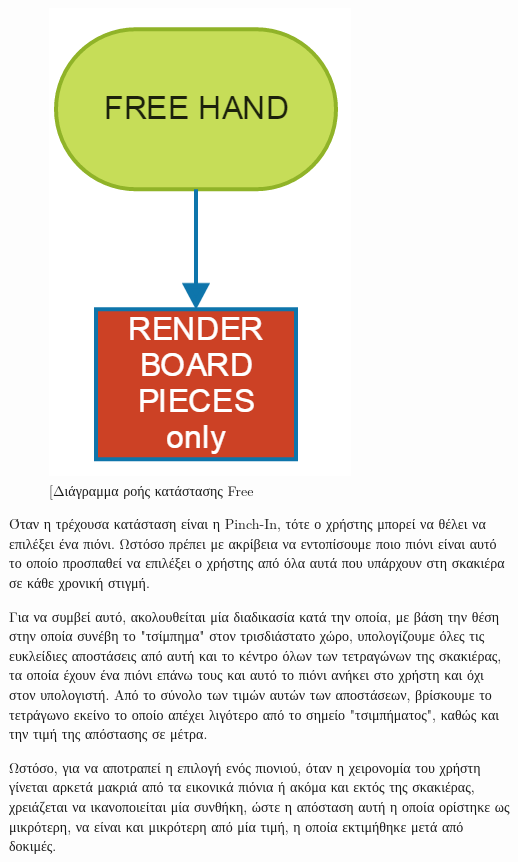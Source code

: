 \begin{figure}[H]
    \centering
    \includegraphics[scale=0.5, angle=0]{Files/Figures/free_hand.png}
    \caption[Διάγραμμα ροής κατάστασης Free]{[Διάγραμμα ροής κατάστασης Free}
    \label{fig:free}
\end{figure}



Όταν η τρέχουσα κατάσταση είναι η Pinch-In, τότε ο χρήστης μπορεί να θέλει να επιλέξει ένα πιόνι. Ωστόσο πρέπει με ακρίβεια να εντοπίσουμε ποιο πιόνι είναι αυτό το οποίο προσπαθεί να επιλέξει ο χρήστης από όλα αυτά που υπάρχουν στη σκακιέρα σε κάθε χρονική στιγμή. 

Για να συμβεί αυτό, ακολουθείται μία διαδικασία κατά την οποία, με βάση την θέση στην οποία συνέβη το "τσίμπημα" στον τρισδιάστατο χώρο, υπολογίζουμε όλες τις ευκλείδιες αποστάσεις από αυτή και το κέντρο όλων των τετραγώνων της σκακιέρας, τα οποία έχουν ένα πιόνι επάνω τους και αυτό το πιόνι ανήκει στο χρήστη και όχι στον υπολογιστή. Από το σύνολο των τιμών αυτών των αποστάσεων, βρίσκουμε το τετράγωνο εκείνο το οποίο απέχει λιγότερο από το σημείο "τσιμπήματος", καθώς και την τιμή της απόστασης σε μέτρα. 


Ωστόσο, για να αποτραπεί η επιλογή ενός πιονιού, όταν η χειρονομία του χρήστη γίνεται αρκετά μακριά από τα εικονικά πιόνια ή ακόμα και εκτός της σκακιέρας, χρειάζεται να ικανοποιείται μία συνθήκη, ώστε η απόσταση αυτή η οποία ορίστηκε ως μικρότερη, να είναι και μικρότερη από μία τιμή, η οποία εκτιμήθηκε μετά από δοκιμές.


